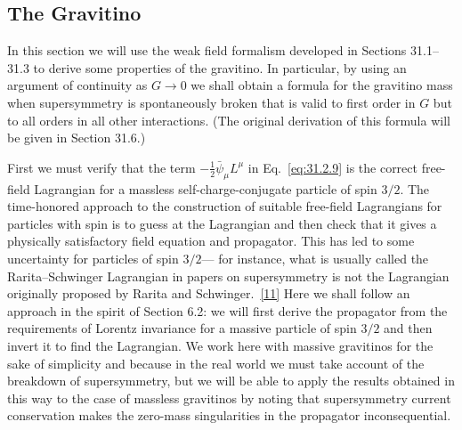 
\subsection{The Gravitino}

In this section we will use the weak field formalism developed in Sections
31.1--31.3 to derive some properties of the gravitino. In particular, by
using an argument of continuity as \(G\to0\) we shall obtain a formula for
the gravitino mass when supersymmetry is spontaneously broken that is valid
to first order in \(G\) but to all orders in all other interactions. (The
original derivation of this formula will be given in Section 31.6.)

First we must verify that the term
\(-\frac12\bar\psi_\mu L^\mu\) in Eq.~\eqref{eq:31.2.9} is the correct
free-field Lagrangian for a massless self-charge-conjugate particle of spin
\(3/2\). The time-honored approach to the construction of suitable
free-field Lagrangians for particles with spin is to guess at the Lagrangian
and then check that it gives a physically satisfactory field equation and
propagator. This has led to some uncertainty for particles of spin \(3/2\)---
for instance, what is usually called the Rarita--Schwinger Lagrangian in
papers on supersymmetry is not the Lagrangian originally proposed by Rarita
and Schwinger.~\hyperref[ch31-ref-11]{[11]} Here we shall follow an approach
in the spirit of Section 6.2: we will first derive the propagator from the
requirements of Lorentz invariance for a massive particle of spin \(3/2\)
and then invert it to find the Lagrangian. We work here with massive
gravitinos for the sake of simplicity and because in the real world we must
take account of the breakdown of supersymmetry, but we will be able to apply
the results obtained in this way to the case of massless gravitinos by
noting that supersymmetry current conservation makes the zero-mass
singularities in the propagator inconsequential.

